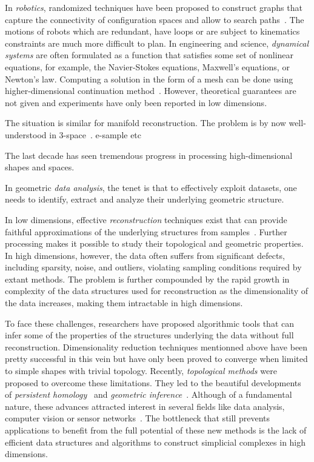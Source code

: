 In {\em robotics}, randomized techniques have been proposed to construct graphs that capture the connectivity of configuration spaces and allow to search paths~\cite{sml-pa-2006}. The motions of robots which are redundant, have loops or are subject to kinematics constraints are much more difficult to plan. In engineering and science, {\em dynamical systems} are often formulated as a function that satisfies some set of nonlinear equations, for example, the Navier-Stokes equations, Maxwell's equations, or Newton's law. Computing a  solution in the form of a mesh can be done using
higher-dimensional continuation method~\cite{mh-mpc-2002}.  However, theoretical guarantees are not given and experiments have only been reported in low dimensions.

The situation is similar for manifold reconstruction. The problem is by now well-understood in 3-space~\cite{dey-csr-2007}.  e-sample etc 


The last decade has seen tremendous progress in processing high-dimensional shapes and spaces. 




In geometric {\em data analysis}, the tenet is that to effectively exploit datasets, one needs to identify, extract and analyze their underlying geometric structure.  

In low dimensions, effective {\em reconstruction} techniques exist that can provide faithful approximations of the underlying structures from samples~\cite{dey-csr-2007}. Further processing makes it possible to study their topological and geometric properties. In high dimensions, however, the data often suffers from significant defects, including sparsity, noise, and outliers, violating sampling conditions required by extant methods. The problem is further compounded by the rapid growth in complexity of the data structures used for reconstruction as the dimensionality of the data increases, making them intractable in high dimensions. 


To face these challenges, researchers have proposed algorithmic tools that can infer some of the properties of the structures underlying the data without full reconstruction. Dimensionality reduction techniques mentionned above have been pretty successful in this vein %
but have only been proved to converge when limited to simple shapes with trivial topology.  Recently, {\em topological methods} were proposed to overcome these limitations. They led to the beautiful developments of {\em persistent homology}~\cite{eh-ph-2008} and {\em geometric inference}~\cite{geometrica-ccl09}. Although of a fundamental nature, these advances attracted interest in several fields like data analysis, computer vision or sensor networks~\cite{rg-bptd-2008}. The bottleneck that still prevents applications to benefit from the full potential of these new methods is the lack of efficient data structures and algorithms to construct simplicial complexes in high dimensions.


